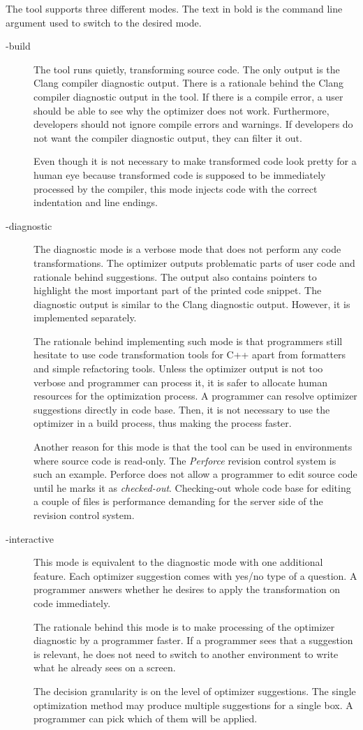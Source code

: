 The tool supports three different modes. The text in bold is the command line argument used to switch to the desired mode.
\begin{description}
\item[-build]{
The tool runs quietly, transforming source code. The only output is the Clang compiler diagnostic output. There is a rationale behind the Clang compiler diagnostic output in the tool. If there is a compile error, a user should be able to see why the optimizer does not work. Furthermore, developers should not ignore compile errors and warnings. If developers do not want the compiler diagnostic output, they can filter it out.

Even though it is not necessary to make transformed code look pretty for a human eye because transformed code is supposed to be immediately processed by the compiler, this mode injects code with the correct indentation and line endings.
}
\item[-diagnostic]{
The diagnostic mode is a verbose mode that does not perform any code transformations. The optimizer outputs problematic parts of user code and rationale behind suggestions. The output also contains pointers to highlight the most important part of the printed code snippet. The diagnostic output is similar to the Clang diagnostic output. However, it is implemented separately.

The rationale behind implementing such mode is that programmers still hesitate to use code transformation tools for C++ apart from formatters and simple refactoring tools. Unless the optimizer output is not too verbose and programmer can process it, it is safer to allocate human resources for the optimization process. A programmer can resolve optimizer suggestions directly in code base. Then, it is not necessary to use the optimizer in a build process, thus making the process faster.

Another reason for this mode is that the tool can be used in environments where source code is read-only. The \emph{Perforce} \cite{perforce} revision control system is such an example. Perforce does not allow a programmer to edit source code until he marks it as \emph{checked-out}. Checking-out whole code base for editing a couple of files is performance demanding for the server side of the revision control system.
}
\item[-interactive]{
This mode is equivalent to the diagnostic mode with one additional feature. Each optimizer suggestion comes with yes/no type of a question. A programmer answers whether he desires to apply the transformation on code immediately.

The rationale behind this mode is to make processing of the optimizer diagnostic by a programmer faster. If a programmer sees that a suggestion is relevant, he does not need to switch to another environment to write what he already sees on a screen.

The decision granularity is on the level of optimizer suggestions. The single optimization method may produce multiple suggestions for a single box. A programmer can pick which of them will be applied.
}
\end{description}

